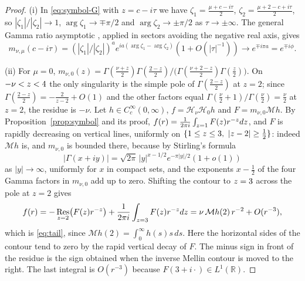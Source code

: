\documentclass[11pt,a4paper,reqno,backref=page]{amsart}
\newcommand{\R}{\mathbb R}
\newcommand{\HH}{\mathcal H}                 %
\newcommand{\Mell}{\mathcal M}               %
\DeclareMathOperator{\Res}{Res}
\let\Re\relax\DeclareMathOperator{\Re}{Re}
\numberwithin{equation}{section}
\theoremstyle{definition}
\theoremstyle{remark}
\begin{document}
\begin{proof}
(i) In \eqref{eq:symbol-G} with $z=c-i\tau$ we have
$\zeta_1=\frac{\mu+c-i\tau}2$, $\zeta_2=\frac{\mu+2-c+i\tau}2$,
so $|\zeta_1|/|\zeta_2|\to1$, $\arg\zeta_1\to\mp\pi/2$ and
$\arg\zeta_2\to\pm\pi/2$ as $\tau\to\pm\infty$. The general
Gamma ratio asymptotic \cite[Eq.~5.11.12]{NIST}, applied in
sectors avoiding the negative real axis, gives
$$m_{\nu,\mu}(c-i\tau)=(|\zeta_1|/|\zeta_2|)^a
e^{ia(\arg\zeta_1-\arg\zeta_2)} (1+O(|\tau|^{-1}))\to e^{\mp
i\pi a}=e^{\mp i\phi}.$$

(ii) For $\mu=0$,
$m_{\nu,0}(z)=\Gamma(\frac{\nu+z}2)\Gamma(\frac{2-z}2)
/\bigl(\Gamma(\frac{\nu+2-z}2)\Gamma(\frac z2)\bigr)$. On
$-\nu<\Re z<4$ the only singularity is the simple pole of
$\Gamma(\frac{2-z}2)$ at $z=2$; since
$\Gamma(\frac{2-z}2)=-\frac2{z-2}+O(1)$ and the other factors
equal $\Gamma(\frac\nu2+1)/\Gamma(\frac\nu2)=\frac\nu2$ at
$z=2$, the residue is $-\nu$. Let $h\in C_c^\infty(0,\infty)$,
$f=\HH_\nu\HH_0h$ and $F=m_{\nu,0}\Mell h$. By
Proposition~\ref{prop:symbol} and its proof, $f(r)=\frac1{2\pi
i}\int_{\Re z=1}F(z)r^{-z}dz$, and $F$ is rapidly decreasing on
vertical lines, uniformly on $\{1\le\Re z\le3,\
|z-2|\ge\frac12\}$: indeed $\Mell h$ is, and $m_{\nu,0}$ is
bounded there, because by Stirling's formula
\cite[Eq.~5.11.9]{NIST}
$$|\Gamma(x+iy)|=\sqrt{2\pi}\,|y|^{x-1/2}e^{-\pi|y|/2}(1+o(1))$$
as $|y|\to\infty$, uniformly for $x$ in compact sets, and the
exponents $x-\frac12$ of the four Gamma factors in $m_{\nu,0}$
add up to zero. Shifting the contour to $\Re z=3$ across the
pole at $z=2$ gives
\begin{equation*}
  f(r)=-\Res_{z=2}\bigl(F(z)r^{-z}\bigr)+\frac1{2\pi
  i}\int_{\Re z=3}F(z)r^{-z}dz
  =\nu\,\Mell h(2)\,r^{-2}+O(r^{-3}),
\end{equation*}
which is \eqref{eq:tail}, since $\Mell h(2)=\int_0^\infty
h(s)s\,ds$. Here the horizontal sides of the contour tend to
zero by the rapid vertical decay of $F$. The minus sign in front
of the residue is the sign obtained when the inverse Mellin
contour is moved to the right. The last integral is $O(r^{-3})$
because $F(3+i\cdot)\in L^1(\R)$.


\end{proof}
\end{document}
